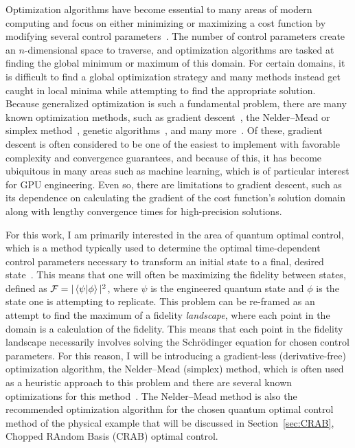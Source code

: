Optimization algorithms have become essential to many areas of modern computing and focus on either minimizing or maximizing a cost function by modifying several control parameters~\cite{lewis2012}.
The number of control parameters create an $n$-dimensional space to traverse, and optimization algorithms are tasked at finding the global minimum or maximum of this domain.
For certain domains, it is difficult to find a global optimization strategy and many methods instead get caught in local minima while attempting to find the appropriate solution.
Because generalized optimization is such a fundamental problem, there are many known optimization methods, such as gradient descent~\cite{ruder2016}, the Nelder--Mead or simplex method~\cite{nelder1965}, genetic algorithms~\cite{koza1997}, and many more~\cite{lewis2012}.
Of these, gradient descent is often considered to be one of the easiest to implement with favorable complexity and convergence guarantees, and because of this, it has become ubiquitous in many areas such as machine learning, which is of particular interest for GPU engineering. 
Even so, there are limitations to gradient descent, such as its dependence on calculating the gradient of the cost function's solution domain along with lengthy convergence times for high-precision solutions.

For this work, I am primarily interested in the area of quantum optimal control, which is a method typically used to determine the optimal time-dependent control parameters necessary to transform an initial state to a final, desired state~\cite{werschnik2007}.
This means that one will often be maximizing the fidelity between states, defined as $\mathcal{F} = |\braket{\psi|\phi}|^2$, where $\psi$ is the engineered quantum state and $\phi$ is the state one is attempting to replicate.
This problem can be re-framed as an attempt to find the maximum of a fidelity \textit{landscape}, where each point in the domain is a calculation of the fidelity.
This means that each point in the fidelity landscape necessarily involves solving the Schr\"odinger equation for chosen control parameters.
For this reason, I will be introducing a gradient-less (derivative-free) optimization algorithm, the Nelder--Mead (simplex) method, which is often used as a heuristic approach to this problem and there are several known optimizations for this method~\cite{nelder1965,kolda2003,lewis2007}.
The Nelder--Mead method is also the recommended optimization algorithm for the chosen quantum optimal control method of the physical example that will be discussed in Section~\ref{sec:CRAB}, Chopped RAndom Basis (CRAB) optimal control.

